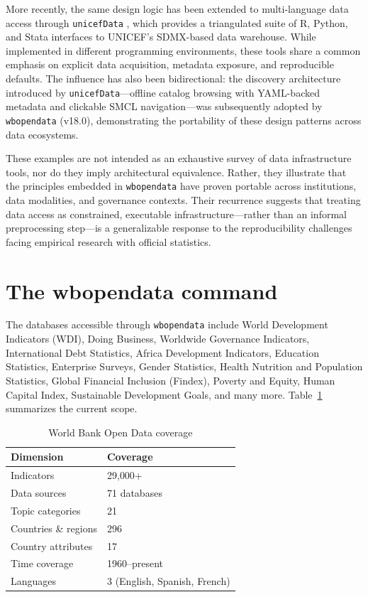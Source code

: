 \documentclass[bib]{statapress}
\begin{document}
More recently, the same design logic has been extended to multi-language data
access through \texttt{unicefData} \citep{unicefdata2026}, which provides a triangulated suite of R, Python,
and Stata interfaces to UNICEF's SDMX-based data warehouse. While implemented in
different programming environments, these tools share a common emphasis on
explicit data acquisition, metadata exposure, and reproducible defaults.
The influence has also been bidirectional: the discovery architecture introduced
by \texttt{unicefData}---offline catalog browsing with YAML-backed metadata and
clickable SMCL navigation---was subsequently adopted by \texttt{wbopendata}
(v18.0), demonstrating the portability of these design patterns across data
ecosystems.

These examples are not intended as an exhaustive survey of data infrastructure
tools, nor do they imply architectural equivalence. Rather, they illustrate that the
principles embedded in \texttt{wbopendata} have proven portable across institutions,
data modalities, and governance contexts. Their recurrence suggests that treating
data access as constrained, executable infrastructure—rather than an informal
preprocessing step—is a generalizable response to the reproducibility challenges
facing empirical research with official statistics.

\section{The wbopendata command}\label{sec:command}

The databases accessible through \texttt{wbopendata} include World Development Indicators (WDI), Doing Business, Worldwide Governance Indicators, International Debt Statistics, Africa Development Indicators, Education Statistics, Enterprise Surveys, Gender Statistics, Health Nutrition and Population Statistics, Global Financial Inclusion (Findex), Poverty and Equity, Human Capital Index, Sustainable Development Goals, and many more. Table~\ref{tab:coverage} summarizes the current scope.

\begin{table}[htbp]
\centering
\caption{World Bank Open Data coverage}
\label{tab:coverage}
\begin{tabular}{ll}
\hline
Dimension & Coverage \\
\hline
Indicators & 29{,}000+ \\
Data sources & 71 databases \\
Topic categories & 21 \\
Countries \& regions & 296 \\
Country attributes & 17 \\
Time coverage & 1960--present \\
Languages & 3 (English, Spanish, French) \\
\hline
\end{tabular}
\end{table}
\end{document}
